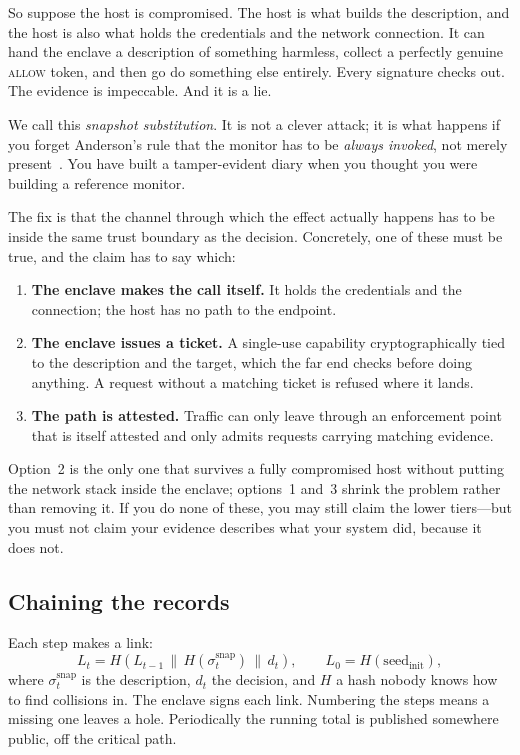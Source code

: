 \documentclass[11pt]{article}
\begin{document}
So suppose the host is compromised. The host is what builds the description,
and the host is also what holds the credentials and the network connection. It
can hand the enclave a description of something harmless, collect a perfectly
genuine \textsc{allow} token, and then go do something else entirely. Every
signature checks out. The evidence is impeccable. And it is a lie.

We call this \emph{snapshot substitution}. It is not a clever attack; it is
what happens if you forget Anderson's rule that the monitor has to be
\emph{always invoked}, not merely present~\cite{anderson1972,saltzer1975}. You
have built a tamper-evident diary when you thought you were building a
reference monitor.

The fix is that the channel through which the effect actually happens has to
be inside the same trust boundary as the decision. Concretely, one of these
must be true, and the claim has to say which:

\begin{enumerate}[itemsep=1pt,topsep=2pt]
\item \textbf{The enclave makes the call itself.} It holds the credentials and
the connection; the host has no path to the endpoint.
\item \textbf{The enclave issues a ticket.} A single-use capability
cryptographically tied to the description and the target, which the far end
checks before doing anything. A request without a matching ticket is refused
where it lands.
\item \textbf{The path is attested.} Traffic can only leave through an
enforcement point that is itself attested and only admits requests carrying
matching evidence.
\end{enumerate}

Option~2 is the only one that survives a fully compromised host without
putting the network stack inside the enclave; options~1 and~3 shrink the
problem rather than removing it. If you do none of these, you may still claim
the lower tiers---but you must not claim your evidence describes what your
system did, because it does not.

\subsection{Chaining the records}
Each step makes a link:
\begin{equation}
L_t = H\!\left(L_{t-1} \,\|\, H(\sigma_t^{\mathrm{snap}}) \,\|\, d_t\right),
\qquad L_0 = H(\mathrm{seed}_{\mathrm{init}}),
\end{equation}
where $\sigma_t^{\mathrm{snap}}$ is the description, $d_t$ the decision, and
$H$ a hash nobody knows how to find collisions in. The enclave signs each
link. Numbering the steps means a missing one leaves a hole. Periodically the
running total is published somewhere public, off the critical path.
\end{document}
